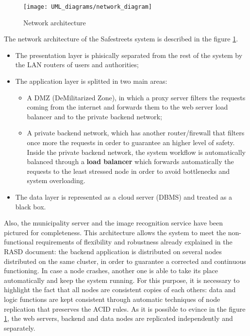 \begin{figure}[H]
    \centering
    \texttt{[image: UML\_diagrams/network\_diagram]}
    \caption{Network architecture}
    \label{fig:network_diagram}
\end{figure}
The network architecture of the Safestreets system is described in the figure \ref{fig:network_diagram}. 
\begin{itemize}
    \item The presentation layer is phisically separated from the rest of the system by the LAN routers of users and authorities;
    \item The application layer is splitted in two main areas: 
        \begin{itemize}
            \item A DMZ (DeMilitarized Zone), in which a proxy server filters the requests coming from the internet and forwards them to the web server load balancer and to the private backend network;
            \item A private backend network, which has another router/firewall that filters once more the requests in order to guarantee an higher level of safety. Inside the private backend network, the system workflow is automatically balanced through a \textbf{load balancer} which forwards automatically the requests to the least stressed node in order to avoid bottlenecks and system overloading.
        \end{itemize}
    \item The data layer is represented as a cloud server (DBMS) and treated as a black box.
\end{itemize}
Also, the municipality server and the image recognition service have been pictured for completeness.\newline
This architecture allows the system to meet the non-functional requirements of flexibility and robustness already explained in the RASD document: 
the backend application is distributed on several nodes distributed on the same cluster, in order to guarantee a corrected and continuous functioning. In case a node crashes, another one is able to take its place automatically and keep the system running. For this purpose, it is necessary to highlight the fact that all nodes are consistent copies of each others: data and logic functions are kept consistent through automatic techniques of node replication that preserves the ACID rules.  
\newline As it is possible to evince in the figure \ref{fig:network_diagram}, the web servers, backend and data nodes are replicated independently and separately.
